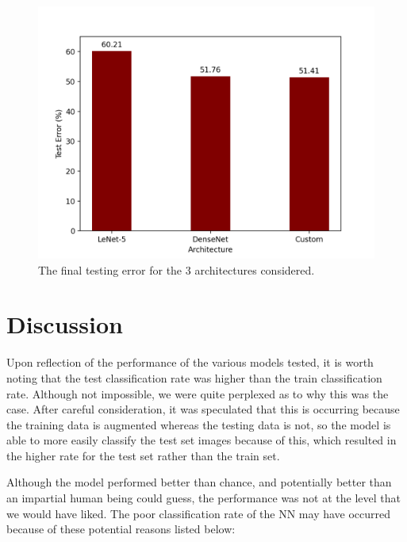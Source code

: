 \documentclass[manuscript,screen,review]{acmart}
\begin{document}
\begin{figure}[h]
  \centering
  \includegraphics[width=\linewidth]{../presentation/finaltest_error.png}
  \caption{The final testing error for the 3 architectures considered.}
  \label{fig:test}
\end{figure}



\section{Discussion}

Upon reflection of the performance of the various models tested, it is worth noting that the test classification rate was higher than the train classification rate. Although not impossible, we were quite perplexed as to why this was the case. After careful consideration, it was speculated that this is occurring because the training data is augmented whereas the testing data is not, so the model is able to more easily classify the test set images because of this, which resulted in the higher rate for the test set rather than the train set.
\par
Although the model performed better than chance, and potentially better than an impartial human being could guess, the performance was not at the level that we would have liked. The poor classification rate of the NN may have occurred because of these potential reasons listed below:
\end{document}
